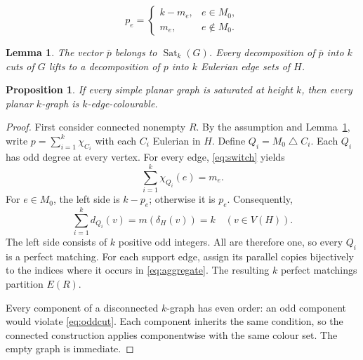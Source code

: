 \documentclass[10pt,a4paper]{amsart}
\newtheorem{lemma}{Lemma}
\newtheorem{proposition}{Proposition}
\DeclareMathOperator{\Sat}{Sat}
\newcommand{\symd}{\mathbin{\triangle}}
\begin{document}
\begin{equation}\label{eq:switch}
 p_e=\begin{cases}k-m_e,&e\in M_0,\\m_e,&e\notin M_0.\end{cases}
\end{equation}

\begin{lemma}\label{lem:simplify}
The vector $\bar p$ belongs to $\Sat_k(G)$.
Every decomposition of $\bar p$ into $k$ cuts of $G$ lifts to a decomposition of $p$ into $k$ Eulerian edge sets of $H$.
\end{lemma}

\begin{proposition}\label{prop:reverse}
If every simple planar graph is saturated at height $k$, then every planar $k$-graph is $k$-edge-colourable.
\end{proposition}

\begin{proof}
First consider connected nonempty $R$.
By the assumption and Lemma~\ref{lem:simplify}, write $p=\sum_{i=1}^k\chi_{C_i}$ with each $C_i$ Eulerian in $H$.
Define $Q_i=M_0\symd C_i$.
Each $Q_i$ has odd degree at every vertex.
For every edge, \eqref{eq:switch} yields
\begin{equation}\label{eq:aggregate}
 \sum_{i=1}^k\chi_{Q_i}(e)=m_e.
\end{equation}
For $e\in M_0$, the left side is $k-p_e$; otherwise it is $p_e$.
Consequently,
\begin{equation}\label{eq:budget}
 \sum_{i=1}^k d_{Q_i}(v)=m(\delta_H(v))=k\quad(v\in V(H)).
\end{equation}
The left side consists of $k$ positive odd integers.
All are therefore one, so every $Q_i$ is a perfect matching.
For each support edge, assign its parallel copies bijectively to the indices where it occurs in \eqref{eq:aggregate}.
The resulting $k$ perfect matchings partition $E(R)$.

Every component of a disconnected $k$-graph has even order: an odd component would violate \eqref{eq:oddcut}.
Each component inherits the same condition, so the connected construction applies componentwise with the same colour set.
The empty graph is immediate.
\end{proof}
\end{document}
